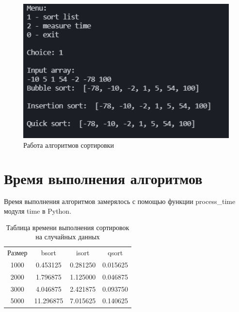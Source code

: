 \documentclass[12pt]{report}
\begin{document}
\begin{figure}[h]
	\begin{center}
	\includegraphics[scale=1.3]{example.png}
	 \caption{Работа алгоритмов сортировки}
	\end{center}
\end{figure}

\section{Время выполнения алгоритмов}
Время выполнения алгоритмов замерялось с помощью функции process\_time модуля time в Python.

\begin{table} [h!]
	\caption{Таблица времени выполнения сортировок на случайных данных}
	\begin{center}
		\begin{tabular}{|c c c c|}
			
			\hline
			
			Размер & bsort & isort  & qsort \\ [0.5ex]
			
			1000 & 0.453125 & 0.281250 & 0.015625 \\ 
			
			\hline 
			
			2000 & 1.796875 & 1.125000 & 0.046875 \\ 
			
			\hline 
			
			3000 & 4.046875 & 2.421875 & 0.093750 \\ 
			
			\hline 
			
			5000 & 11.296875 & 7.015625 & 0.140625 \\ 
			
			\hline 
			
		\end{tabular}
	\end{center}
\end{table}
\end{document}
